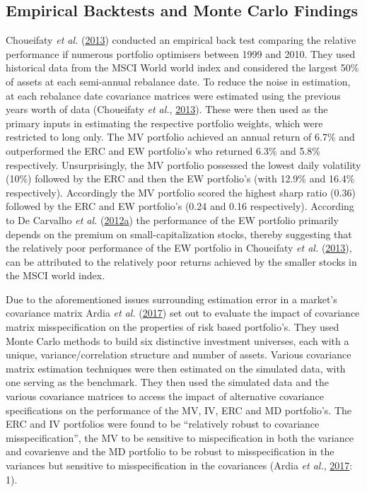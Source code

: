 \documentclass[11pt,preprint, authoryear]{elsarticle}
\numberwithin{equation}{section}
\numberwithin{figure}{section}
\numberwithin{table}{section}
\begin{document}
\hypertarget{empirical-backtests-and-monte-carlo-findings}{%
\subsection{Empirical Backtests and Monte Carlo
Findings}\label{empirical-backtests-and-monte-carlo-findings}}

Choueifaty \emph{et al.} (\protect\hyperlink{ref-choueifaty2013}{2013})
conducted an empirical back test comparing the relative performance if
numerous portfolio optimisers between 1999 and 2010. They used
historical data from the MSCI World world index and considered the
largest 50\% of assets at each semi-annual rebalance date. To reduce the
noise in estimation, at each rebalance date covariance matrices were
estimated using the previous years worth of data (Choueifaty \emph{et
al.}, \protect\hyperlink{ref-choueifaty2013}{2013}). These were then
used as the primary inputs in estimating the respective portfolio
weights, which were restricted to long only. The MV portfolio achieved
an annual return of 6.7\% and outperformed the ERC and EW portfolio's
who returned 6.3\% and 5.8\% respectively. Unsurprisingly, the MV
portfolio possessed the lowest daily volatility (10\%) followed by the
ERC and then the EW portfolio's (with 12.9\% and 16.4\% respectively).
Accordingly the MV portfolio scored the highest sharp ratio (0.36)
followed by the ERC and EW portfolio's (0.24 and 0.16 respectively).
According to De Carvalho \emph{et al.}
(\protect\hyperlink{ref-leote}{2012}\protect\hyperlink{ref-leote}{a})
the performance of the EW portfolio primarily depends on the premium on
small-capitalization stocks, thereby suggesting that the relatively poor
performance of the EW portfolio in Choueifaty \emph{et al.}
(\protect\hyperlink{ref-choueifaty2013}{2013}), can be attributed to the
relatively poor returns achieved by the smaller stocks in the MSCI world
index.

Due to the aforementioned issues surrounding estimation error in a
market's covariance matrix Ardia \emph{et al.}
(\protect\hyperlink{ref-ardia2017}{2017}) set out to evaluate the impact
of covariance matrix misspecification on the properties of risk based
portfolio's. They used Monte Carlo methods to build six distinctive
investment universes, each with a unique, variance/correlation structure
and number of assets. Various covariance matrix estimation techniques
were then estimated on the simulated data, with one serving as the
benchmark. They then used the simulated data and the various covariance
matrices to access the impact of alternative covariance specifications
on the performance of the MV, IV, ERC and MD portfolio's. The ERC and IV
portfolios were found to be ``relatively robust to covariance
misspecification'', the MV to be sensitive to mispecification in both
the variance and covarienve and the MD portfolio to be robust to
misspecification in the variances but sensitive to misspecification in
the covariances (Ardia \emph{et al.},
\protect\hyperlink{ref-ardia2017}{2017}: 1).
\end{document}
